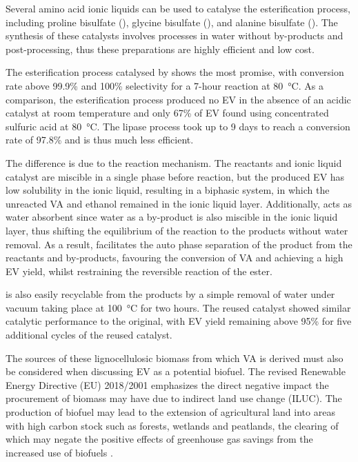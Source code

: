 \documentclass[11pt]{article}
\begin{document}
Several amino acid ionic liquids can be used to catalyse the esterification process, including proline bisulfate (), glycine bisulfate (), and alanine bisulfate (). The synthesis of these catalysts involves processes in water without by-products and post-processing, thus these preparations are highly efficient and low cost. 

The esterification process catalysed by  shows the most promise, with conversion rate above 99.9\% and 100\% selectivity for a 7-hour reaction at \SI{80}{\celsius}. As a comparison, the esterification process produced no EV in the absence of an acidic catalyst at room temperature and only 67\% of EV found using concentrated sulfuric acid at \SI{80}{\celsius}. The lipase process took up to 9 days to reach a conversion rate of 97.8\% and is thus much less efficient. 

The difference is due to the reaction mechanism. The reactants and ionic liquid catalyst are miscible in a single phase before reaction, but the produced EV has low solubility in the ionic liquid, resulting in a biphasic system, in which the unreacted VA and ethanol remained in the ionic liquid layer. Additionally,  acts as water absorbent since water as a by-product is also miscible in the ionic liquid layer, thus shifting the equilibrium of the reaction to the products without water removal. As a result,  facilitates the auto phase separation of the product from the reactants and by-products, favouring the conversion of VA and achieving a high EV yield, whilst restraining the reversible reaction of the ester. 

 is also easily recyclable from the products by a simple removal of water under vacuum taking place at \SI{100}{\celsius} for two hours. The reused catalyst showed similar catalytic performance to the original, with EV yield remaining above 95\% for five additional cycles of the reused catalyst.   

The sources of these lignocellulosic biomass from which VA is derived must also be considered when discussing EV as a potential biofuel. The revised Renewable Energy Directive (EU) 2018/2001 emphasizes the direct negative impact the procurement of biomass may have due to indirect land use change (ILUC). The production of biofuel may lead to the extension of agricultural land into areas with high carbon stock such as forests, wetlands and peatlands, the clearing of which may negate the positive effects of greenhouse gas savings from the increased use of biofuels \cite{q7-r2}. 
\end{document}
